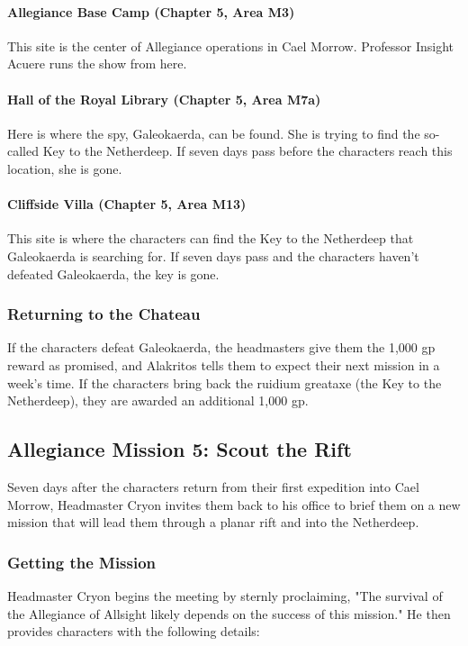 \documentclass[10pt,a4paper,twoside,bg=print,twocolumn,openany,nodeprecatedcode]{dndbook}
\begin{document}
\paragraph{Allegiance Base Camp (Chapter 5, Area M3)}
This site is the center of Allegiance operations in Cael Morrow. Professor Insight Acuere runs the show from here.

\paragraph{Hall of the Royal Library (Chapter 5, Area M7a)}
Here is where the spy, Galeokaerda, can be found. She is trying to find the so-called Key to the Netherdeep. If seven days pass before the characters reach this location, she is gone.

\paragraph{Cliffside Villa (Chapter 5, Area M13)}
This site is where the characters can find the Key to the Netherdeep that Galeokaerda is searching for. If seven days pass and the characters haven't defeated Galeokaerda, the key is gone.

\subsubsection{Returning to the Chateau}
If the characters defeat Galeokaerda, the headmasters give them the 1,000 gp reward as promised, and Alakritos tells them to expect their next mission in a week's time. If the characters bring back the ruidium greataxe (the Key to the Netherdeep), they are awarded an additional 1,000 gp.

\subsection{Allegiance Mission 5: Scout the Rift}
Seven days after the characters return from their first expedition into Cael Morrow, Headmaster Cryon invites them back to his office to brief them on a new mission that will lead them through a planar rift and into the Netherdeep.

\subsubsection{Getting the Mission}
Headmaster Cryon begins the meeting by sternly proclaiming, "The survival of the Allegiance of Allsight likely depends on the success of this mission." He then provides characters with the following details:
\end{document}
